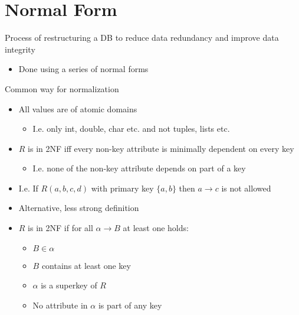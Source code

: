 
\section{Normal Form}
\begin{itemize}
     Process of restructuring a DB to reduce data redundancy and improve data integrity
        \begin{itemize}
            \item Done using a series of normal forms
        \end{itemize}
     Common way for normalization
        \begin{itemize}
            \item All values are of atomic domains
                \begin{itemize}
                    \item I.e. only int, double, char etc. and not tuples, lists etc.
                \end{itemize}
        \end{itemize}
        \begin{itemize}
            \item $R$ is in 2NF iff every non-key attribute is minimally dependent on every key
                \begin{itemize}
                     No attribute depends on part of a key
                    \item I.e. none of the non-key attribute depends on part of a key
                \end{itemize}
            \item I.e. If $R(a, b, c, d)$ with primary key $\{a, b\}$ then $a \to c$ is not allowed
            \item Alternative, less strong definition
            \item $R$ is in 2NF if for all $\alpha \to B$ at least one holds:
                \begin{itemize}
                    \item $B \in \alpha$
                    \item $B$ contains at least one key
                    \item $\alpha$ is a superkey of $R$
                    \item No attribute in $\alpha$ is part of any key

\end{itemize}
\end{itemize}
\end{itemize}
